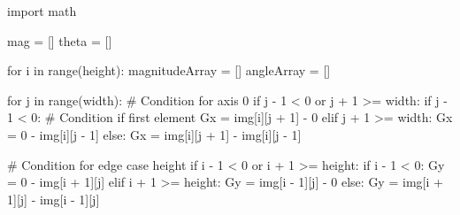 \documentclass[
  letterpaper,
  DIV=11,
  numbers=noendperiod]{scrreprt}
\newenvironment{Shaded}{\begin{snugshade}}{\end{snugshade}}
\newcommand{\BuiltInTok}[1]{\textcolor[rgb]{0.00,0.23,0.31}{#1}}
\newcommand{\CommentTok}[1]{\textcolor[rgb]{0.37,0.37,0.37}{#1}}
\newcommand{\ControlFlowTok}[1]{\textcolor[rgb]{0.00,0.23,0.31}{#1}}
\newcommand{\DecValTok}[1]{\textcolor[rgb]{0.68,0.00,0.00}{#1}}
\newcommand{\ImportTok}[1]{\textcolor[rgb]{0.00,0.46,0.62}{#1}}
\newcommand{\KeywordTok}[1]{\textcolor[rgb]{0.00,0.23,0.31}{#1}}
\newcommand{\NormalTok}[1]{\textcolor[rgb]{0.00,0.23,0.31}{#1}}
\newcommand{\OperatorTok}[1]{\textcolor[rgb]{0.37,0.37,0.37}{#1}}
\begin{document}
\begin{Shaded}
\begin{Highlighting}[]
\ImportTok{import}\NormalTok{ math}

\NormalTok{mag }\OperatorTok{=}\NormalTok{ []}
\NormalTok{theta }\OperatorTok{=}\NormalTok{ []}

\ControlFlowTok{for}\NormalTok{ i }\KeywordTok{in} \BuiltInTok{range}\NormalTok{(height):}
\NormalTok{    magnitudeArray }\OperatorTok{=}\NormalTok{ []}
\NormalTok{    angleArray }\OperatorTok{=}\NormalTok{ []}
    
    \ControlFlowTok{for}\NormalTok{ j }\KeywordTok{in} \BuiltInTok{range}\NormalTok{(width):}
        \CommentTok{\# Condition for axis 0}
        \ControlFlowTok{if}\NormalTok{ j }\OperatorTok{{-}} \DecValTok{1} \OperatorTok{\textless{}} \DecValTok{0} \KeywordTok{or}\NormalTok{ j }\OperatorTok{+} \DecValTok{1} \OperatorTok{\textgreater{}=}\NormalTok{ width:}
            \ControlFlowTok{if}\NormalTok{ j }\OperatorTok{{-}} \DecValTok{1} \OperatorTok{\textless{}} \DecValTok{0}\NormalTok{:}
                \CommentTok{\# Condition if first element}
\NormalTok{                Gx }\OperatorTok{=}\NormalTok{ img[i][j }\OperatorTok{+} \DecValTok{1}\NormalTok{] }\OperatorTok{{-}} \DecValTok{0}
            \ControlFlowTok{elif}\NormalTok{ j }\OperatorTok{+} \DecValTok{1} \OperatorTok{\textgreater{}=}\NormalTok{ width:}
\NormalTok{                Gx }\OperatorTok{=} \DecValTok{0} \OperatorTok{{-}}\NormalTok{ img[i][j }\OperatorTok{{-}} \DecValTok{1}\NormalTok{]}
        \ControlFlowTok{else}\NormalTok{:}
\NormalTok{            Gx }\OperatorTok{=}\NormalTok{ img[i][j }\OperatorTok{+} \DecValTok{1}\NormalTok{] }\OperatorTok{{-}}\NormalTok{ img[i][j }\OperatorTok{{-}} \DecValTok{1}\NormalTok{]}
        
        \CommentTok{\# Condition for edge case height}
        \ControlFlowTok{if}\NormalTok{ i }\OperatorTok{{-}} \DecValTok{1} \OperatorTok{\textless{}} \DecValTok{0} \KeywordTok{or}\NormalTok{ i }\OperatorTok{+} \DecValTok{1} \OperatorTok{\textgreater{}=}\NormalTok{ height:}
            \ControlFlowTok{if}\NormalTok{ i }\OperatorTok{{-}} \DecValTok{1} \OperatorTok{\textless{}} \DecValTok{0}\NormalTok{:}
\NormalTok{                Gy }\OperatorTok{=} \DecValTok{0} \OperatorTok{{-}}\NormalTok{ img[i }\OperatorTok{+} \DecValTok{1}\NormalTok{][j]}
            \ControlFlowTok{elif}\NormalTok{ i }\OperatorTok{+} \DecValTok{1} \OperatorTok{\textgreater{}=}\NormalTok{ height:}
\NormalTok{                Gy }\OperatorTok{=}\NormalTok{ img[i }\OperatorTok{{-}} \DecValTok{1}\NormalTok{][j] }\OperatorTok{{-}} \DecValTok{0}
        \ControlFlowTok{else}\NormalTok{:}
\NormalTok{            Gy }\OperatorTok{=}\NormalTok{ img[i }\OperatorTok{+} \DecValTok{1}\NormalTok{][j] }\OperatorTok{{-}}\NormalTok{ img[i }\OperatorTok{{-}} \DecValTok{1}\NormalTok{][j]}


\end{Highlighting}
\end{Shaded}
\end{document}
